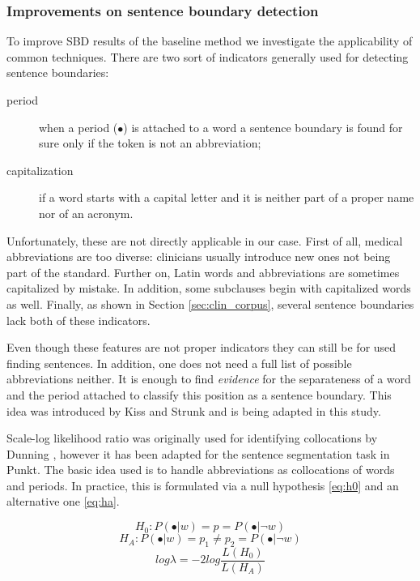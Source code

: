\subsubsection{Improvements on sentence boundary detection}\label{sec:improvements}

To improve SBD results of the baseline method we investigate the applicability of common techniques. There are two sort of indicators generally used for detecting sentence boundaries: 
\begin{description}
 \item[period] when a period ($\bullet$) is attached to a word a sentence boundary is found for sure only if the token is not an abbreviation;
 \item[capitalization] if a word starts with a capital letter and it is neither part of a proper name nor of an acronym.
\end{description}

Unfortunately, these are not directly applicable in our case. First of all, medical abbreviations are too diverse: clinicians usually introduce new ones not being part of the standard. 
Further on, Latin words and abbreviations are sometimes capitalized by mistake. In addition, some subclauses begin with capitalized words as well. 
Finally, as shown in Section \ref{sec:clin_corpus}, several sentence boundaries lack both of these indicators.

Even though these features are not proper indicators they can still be for used finding sentences. In addition, one does not need a full list of possible abbreviations neither. It is enough to find \emph{evidence} for the separateness of a word and the period attached to classify this position as a sentence boundary. 
This idea was introduced by Kiss and Strunk \cite{kiss2006unsupervised} and is being adapted in this study.

Scale-log likelihood ratio was originally used for identifying collocations by Dunning \cite{dunning1993accurate}, however it has been adapted for the sentence segmentation task in Punkt. The basic idea used is to handle abbreviations as collocations of words and periods. In practice, this is formulated via a null hypothesis \eqref{eq:h0} and an alternative one \eqref{eq:ha}. 

\begin{equation} \label{eq:h0}
H_0: P(\bullet|w) = p = P(\bullet|\neg w)
\end{equation}
\vspace{-0.5cm}
\begin{equation} \label{eq:ha}
H_A: P(\bullet|w) = p_1 \neq p_2 = P(\bullet|\neg w) 
\end{equation}
\vspace{-0.5cm}
\begin{equation} \label{eq:loglambda}
log \lambda = -2 log \frac{L(H_0)}{L(H_A)}
\end{equation}


